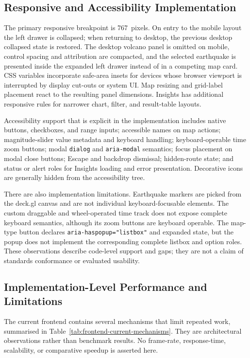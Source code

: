 \documentclass[12pt]{article}
\begin{document}
\subsection{Responsive and Accessibility Implementation}
\label{subsec:frontend_responsive_accessibility}

The primary responsive breakpoint is 767~pixels. On entry to the mobile layout the left drawer is collapsed; when returning to desktop, the previous desktop collapsed state is restored. The desktop volcano panel is omitted on mobile, control spacing and attribution are compacted, and the selected earthquake is presented inside the expanded left drawer instead of in a competing map card. CSS variables incorporate safe-area insets for devices whose browser viewport is interrupted by display cut-outs or system UI. Map resizing and grid-label placement react to the resulting panel dimensions. Insights has additional responsive rules for narrower chart, filter, and result-table layouts.

Accessibility support that is explicit in the implementation includes native buttons, checkboxes, and range inputs; accessible names on map actions; magnitude-slider value metadata and keyboard handling; keyboard-operable time zoom buttons; modal \texttt{dialog} and \texttt{aria-modal} semantics; focus placement on modal close buttons; Escape and backdrop dismissal; hidden-route state; and status or alert roles for Insights loading and error presentation. Decorative icons are generally hidden from the accessibility tree.

There are also implementation limitations. Earthquake markers are picked from the deck.gl canvas and are not individual keyboard-focusable elements. The custom draggable and wheel-operated time track does not expose complete keyboard semantics, although its zoom buttons are keyboard operable. The map-type button declares \texttt{aria-haspopup="listbox"} and expanded state, but the popup does not implement the corresponding complete listbox and option roles. These observations describe code-level support and gaps; they are not a claim of standards conformance or evaluated usability.

\subsection{Implementation-Level Performance and Limitations}
\label{subsec:frontend_performance}

The current frontend contains several mechanisms that limit repeated work, summarised in Table~\ref{tab:frontend-current-mechanisms}. They are architectural observations rather than benchmark results. No frame-rate, response-time, scalability, or comparative speedup is asserted here.
\end{document}

